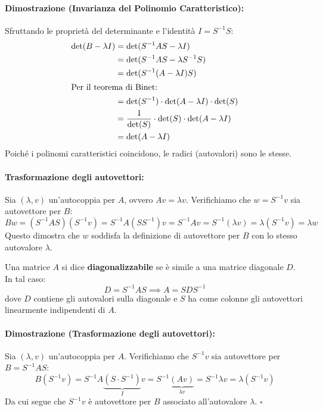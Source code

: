 \documentclass[a4paper,12pt]{article}
\begin{document}
	\paragraph{Dimostrazione (Invarianza del Polinomio Caratteristico):}
	Sfruttando le proprietà del determinante e l'identità $I = S^{-1} S$:
	\begin{align*}
		\det(B - \lambda I) &= \det(S^{-1} A S - \lambda I) \\
		&= \det(S^{-1} A S - \lambda S^{-1} S) \\
		&= \det(S^{-1} (A - \lambda I) S) \\
		\intertext{Per il teorema di Binet:}
		&= \det(S^{-1}) \cdot \det(A - \lambda I) \cdot \det(S) \\
		&= \frac{1}{\det(S)} \cdot \det(S) \cdot \det(A - \lambda I) \\
		&= \det(A - \lambda I)
	\end{align*}
	Poiché i polinomi caratteristici coincidono, le radici (autovalori) sono le stesse.
	
	\paragraph{Trasformazione degli autovettori:}
	Sia $(\lambda, v)$ un'autocoppia per $A$, ovvero $Av = \lambda v$. Verifichiamo che $w = S^{-1}v$ sia autovettore per $B$:
	\[
	B w = (S^{-1} A S) (S^{-1} v) = S^{-1} A (S S^{-1}) v = S^{-1} A v = S^{-1} (\lambda v) = \lambda (S^{-1} v) = \lambda w
	\]
	Questo dimostra che $w$ soddisfa la definizione di autovettore per $B$ con lo stesso autovalore $\lambda$.
	
	\begin{tcolorbox}[title=Osservazione: Diagonalizzabilità, colback=blue!5!white]
		Una matrice $A$ si dice \textbf{diagonalizzabile} se è simile a una matrice diagonale $D$. In tal caso:
		\[ D = S^{-1} A S \implies A = S D S^{-1} \]
		dove $D$ contiene gli autovalori sulla diagonale e $S$ ha come colonne gli autovettori linearmente indipendenti di $A$.
	\end{tcolorbox}
	\paragraph{Dimostrazione (Trasformazione degli autovettori):}
	Sia $(\lambda, v)$ un'autocoppia per $A$. Verifichiamo che $S^{-1}v$ sia autovettore per $B = S^{-1}AS$:
	\begin{equation*}
		B (S^{-1} v) = S^{-1} A \underbrace{(S \cdot S^{-1})}_{I} v = S^{-1} \underbrace{(A v)}_{\lambda v} = S^{-1} \lambda v = \lambda (S^{-1} v)
	\end{equation*}
	Da cui segue che $S^{-1}v$ è autovettore per $B$ associato all'autovalore $\lambda$. $\square$
	
\end{document}
